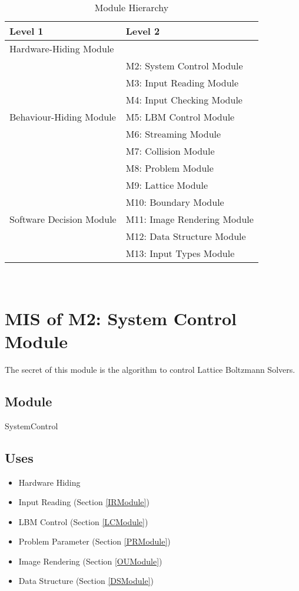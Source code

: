 \documentclass[12pt, titlepage]{article}
\newcommand{\famname}{Lattice Boltzmann Solvers}
\begin{document}
\begin{table}[h!]
	\centering
	\begin{tabular}{p{} p{}}
		\toprule
		\textbf{Level 1} & \textbf{Level 2}\\
		\midrule
		
		{Hardware-Hiding Module}
		& \\
		\midrule
		
		\multirow{7}{0.3\textwidth}{Behaviour-Hiding Module}
		& M2: System Control Module\\
		& M3: Input Reading Module\\
		& M4: Input Checking Module\\
		& M5: LBM Control Module\\
		& M6: Streaming Module\\
		& M7: Collision Module\\ 
		& M8: Problem Module\\
		& M9: Lattice Module\\
		& M10: Boundary Module\\
		\midrule
		
		\multirow{1}{0.3\textwidth}{Software Decision Module}
		& M11: Image Rendering Module\\
		& M12: Data Structure Module\\
		& M13: Input Types Module\\
		\bottomrule
		
	\end{tabular}
	\caption{Module Hierarchy}
	\label{TblMH}
\end{table}


~\newpage

\section{MIS of M2: System Control Module} \label{SCModule}

The secret of this module is the algorithm to control \famname.

\subsection{Module}

SystemControl

\subsection{Uses}

\begin{itemize}
	\item Hardware Hiding
	\item Input Reading (Section \ref{IRModule})
	\item LBM Control (Section \ref{LCModule})
	\item Problem Parameter (Section \ref{PRModule})
	\item Image Rendering (Section \ref{OUModule})
	\item Data Structure (Section \ref{DSModule})
\end{itemize}
\end{document}
